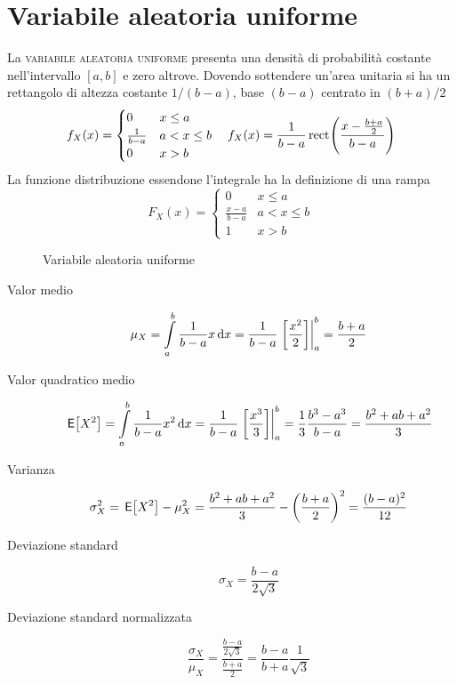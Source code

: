 \section{Variabile aleatoria uniforme}
La \textsc{variabile aleatoria uniforme} presenta una densità di probabilità costante nell'intervallo $[a,b]$ e zero altrove. Dovendo sottendere un'area unitaria si ha un rettangolo di altezza costante $1/(b-a)$, base $(b-a)$ centrato in $(b+a)/2$
\begin{equation}f_X(x)=\begin{cases}0&x\leq a\\ \frac{1}{b-a}&a<x\leq b\\0&x>b\end{cases}\quad f_X(x)=\frac{1}{b-a}\rect{\frac{x-\frac{b+a}{2}}{b-a}}\end{equation}
La funzione distribuzione essendone l'integrale ha la definizione di una rampa
\begin{equation}F_X(x)=\begin{cases}
0&x\leq a\\ \frac{x-a}{b-a}&a<x\leq b\\1&x>b
\end{cases}\end{equation}
\begin{figure}[h!]
	\centering
	\qquad
	\caption{Variabile aleatoria uniforme}
\end{figure}

\begin{description}
\item[Valor medio]\[\mu_X=\intd{a}{b}{\frac{1}{b-a}x}{x}=\frac{1}{b-a}\bound{a}{b}{\frac{x^2}{2}}=\frac{b+a}{2}\]
\item[Valor quadratico medio] \[\E{X^2}=\intd{a}{b}{\frac{1}{b-a}x^2}{x}=\frac{1}{b-a}\bound{a}{b}{\frac{x^3}{3}}=\frac{1}{3}\frac{b^3-a^3}{b-a}=\frac{b^2+a b+a^2}{3}\]
\item[Varianza]\[\sigma^2_X=\E{X^2}-\mu^2_X=\frac{b^2+a b+a^2}{3}-\left(\frac{b+a}{2}\right)^2=\frac{(b-a)^2}{12}\]
\item[Deviazione standard]\[\sigma_X=\frac{b-a}{2\sqrt{3}}\]
\item[Deviazione standard normalizzata]\[\frac{\sigma_X}{\mu_X}=\frac{\frac{b-a}{2\sqrt{3}}}{\frac{b+a}{2}}=\frac{b-a}{b+a}\frac{1}{\sqrt{3}}\]
\end{description}

